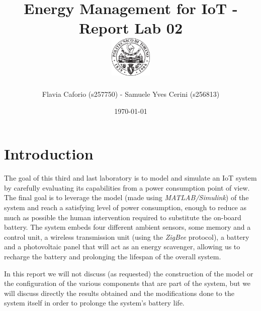 \documentclass[a4paper]{article}
\begin{document}
    \title{
        Energy Management for IoT - Report Lab 02 \\[0.5cm]
        \includegraphics[width=0.15\textwidth]{PoliLogo.png}%
    }
    \author{Flavia Caforio (s257750) - Samuele Yves Cerini (s256813)}
    \date{\today}
    \maketitle

    \tableofcontents

%
\section{Introduction}
    The goal of this third and last laboratory is to model and simulate an IoT system by carefully evaluating its capabilities from a power consumption point of view. The final goal is to leverage the model (made using \emph{MATLAB/Simulink}) of the system and reach a satisfying level of power consumption, enough to reduce as much as possible the human intervention required to substitute the on-board battery. The system embeds four different ambient sensors, some memory and a control unit, a wireless transmission unit (using the \emph{ZigBee} protocol), a battery and a photovoltaic panel that will act as an energy scavenger, allowing us to recharge the battery and prolonging the lifespan of the overall system.
    
    In this report we will not discuss (as requested) the construction of the model or the configuration of the various components that are part of the system, but we will discuss directly the results obtained and the modifications done to the system itself in order to prolonge the system's battery life.
\end{document}
